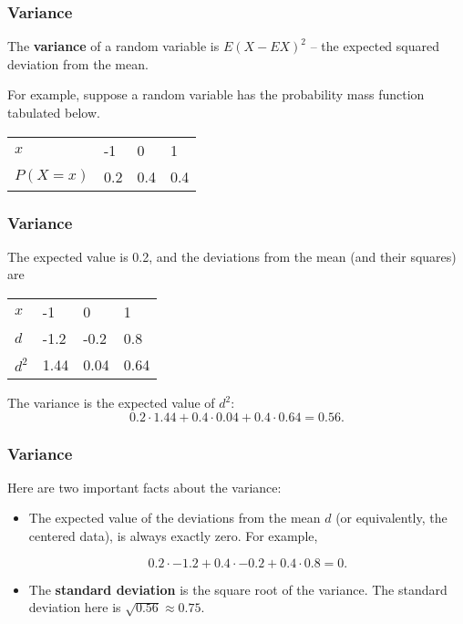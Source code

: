 \begin{frame}
\frametitle{Variance}

The {\bf variance} of a random variable is $E(X-EX)^2$ -- the expected
squared deviation from the mean.

For example, suppose a random variable has the probability mass function
tabulated below.

\begin{center}
\begin{tabular}{llll}\\\hline
$x$ & -1 & 0 & 1\\
$P(X=x)$ & 0.2 & 0.4 & 0.4\\\hline
\end{tabular}
\end{center}

\end{frame}

\begin{frame}
\frametitle{Variance}

The expected value is 0.2, and the deviations from the mean (and their
squares) are

\begin{center}
\begin{tabular}{llll}\\\hline
$x$ & -1 & 0 & 1\\
$d$ & -1.2 & -0.2 & 0.8\\
$d^2$ & 1.44 & 0.04 & 0.64\\\hline
\end{tabular}
\end{center}

The variance is the expected value of $d^2$:
$$
0.2\cdot 1.44 + 0.4\cdot 0.04 + 0.4\cdot 0.64 = 0.56.
$$

\end{frame}


\begin{frame}
\frametitle{Variance}

Here are two important facts about the variance:

\begin{itemize}

\item The expected value of the deviations from the mean $d$ (or
  equivalently, the centered data), is always exactly zero.  For
  example,

$$
0.2\cdot -1.2 + 0.4\cdot -0.2 + 0.4\cdot 0.8 = 0.
$$

\item The {\bf standard deviation} is the square root of the variance.
  The standard deviation here is $\sqrt{0.56} \approx
  0.75$.

\end{itemize}

\end{frame}

